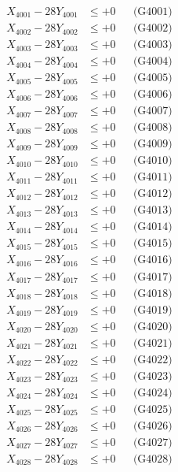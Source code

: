 \documentclass[a4paper,10pt]{article}
\begin{document}
{\begin{align}
\allowbreak
X_{4001} - 28Y_{4001} &\leq +0 && \text{(G4001)} \\
X_{4002} - 28Y_{4002} &\leq +0 && \text{(G4002)} \\
X_{4003} - 28Y_{4003} &\leq +0 && \text{(G4003)} \\
X_{4004} - 28Y_{4004} &\leq +0 && \text{(G4004)} \\
X_{4005} - 28Y_{4005} &\leq +0 && \text{(G4005)} \\
X_{4006} - 28Y_{4006} &\leq +0 && \text{(G4006)} \\
X_{4007} - 28Y_{4007} &\leq +0 && \text{(G4007)} \\
X_{4008} - 28Y_{4008} &\leq +0 && \text{(G4008)} \\
X_{4009} - 28Y_{4009} &\leq +0 && \text{(G4009)} \\
X_{4010} - 28Y_{4010} &\leq +0 && \text{(G4010)} \\
\allowbreak
X_{4011} - 28Y_{4011} &\leq +0 && \text{(G4011)} \\
X_{4012} - 28Y_{4012} &\leq +0 && \text{(G4012)} \\
X_{4013} - 28Y_{4013} &\leq +0 && \text{(G4013)} \\
X_{4014} - 28Y_{4014} &\leq +0 && \text{(G4014)} \\
X_{4015} - 28Y_{4015} &\leq +0 && \text{(G4015)} \\
X_{4016} - 28Y_{4016} &\leq +0 && \text{(G4016)} \\
X_{4017} - 28Y_{4017} &\leq +0 && \text{(G4017)} \\
X_{4018} - 28Y_{4018} &\leq +0 && \text{(G4018)} \\
X_{4019} - 28Y_{4019} &\leq +0 && \text{(G4019)} \\
X_{4020} - 28Y_{4020} &\leq +0 && \text{(G4020)} \\
\allowbreak
X_{4021} - 28Y_{4021} &\leq +0 && \text{(G4021)} \\
X_{4022} - 28Y_{4022} &\leq +0 && \text{(G4022)} \\
X_{4023} - 28Y_{4023} &\leq +0 && \text{(G4023)} \\
X_{4024} - 28Y_{4024} &\leq +0 && \text{(G4024)} \\
X_{4025} - 28Y_{4025} &\leq +0 && \text{(G4025)} \\
X_{4026} - 28Y_{4026} &\leq +0 && \text{(G4026)} \\
X_{4027} - 28Y_{4027} &\leq +0 && \text{(G4027)} \\
X_{4028} - 28Y_{4028} &\leq +0 && \text{(G4028)} \\

\end{align}}
\end{document}
